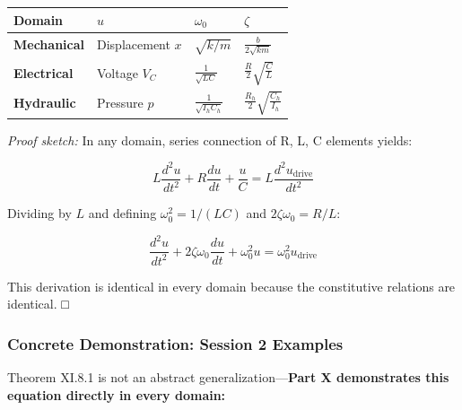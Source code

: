 \documentclass[
]{article}
\begin{document}
\begin{longtable}[]{@{}
  >{\raggedright\arraybackslash}p{}
  >{\raggedright\arraybackslash}p{}
  >{\raggedright\arraybackslash}p{}
  >{\raggedright\arraybackslash}p{}@{}}
\toprule\noalign{}
\begin{minipage}[b]{\linewidth}\raggedright
Domain
\end{minipage} & \begin{minipage}[b]{\linewidth}\raggedright
\(u\)
\end{minipage} & \begin{minipage}[b]{\linewidth}\raggedright
\(\omega_0\)
\end{minipage} & \begin{minipage}[b]{\linewidth}\raggedright
\(\zeta\)
\end{minipage} \\
\midrule\noalign{}
\endhead
\bottomrule\noalign{}
\endlastfoot
\textbf{Mechanical} & Displacement \(x\) & \(\sqrt{k/m}\) &
\(\frac{b}{2\sqrt{km}}\) \\
\textbf{Electrical} & Voltage \(V_C\) & \(\frac{1}{\sqrt{LC}}\) &
\(\frac{R}{2}\sqrt{\frac{C}{L}}\) \\
\textbf{Hydraulic} & Pressure \(p\) & \(\frac{1}{\sqrt{I_h C_h}}\) &
\(\frac{R_h}{2}\sqrt{\frac{C_h}{I_h}}\) \\
\end{longtable}

\emph{Proof sketch:} In any domain, series connection of R, L, C
elements yields:

\[L\frac{d^2u}{dt^2} + R\frac{du}{dt} + \frac{u}{C} = L\frac{d^2u_{\text{drive}}}{dt^2}\]

Dividing by \(L\) and defining \(\omega_0^2 = 1/(LC)\) and
\(2\zeta\omega_0 = R/L\):

\[\frac{d^2u}{dt^2} + 2\zeta\omega_0\frac{du}{dt} + \omega_0^2 u = \omega_0^2 u_{\text{drive}}\]

This derivation is identical in every domain because the constitutive
relations are identical. □

\subsubsection{Concrete Demonstration: Session 2
Examples}\label{concrete-demonstration-session-2-examples-1}

Theorem XI.8.1 is not an abstract generalization---\textbf{Part X
demonstrates this equation directly in every domain:}
\end{document}
